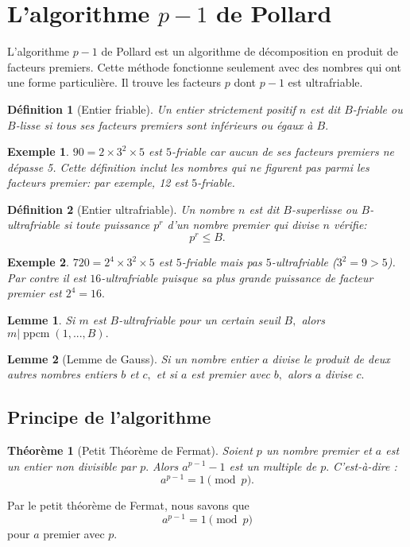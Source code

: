 \documentclass[french, 12pt, titlepage]{article}
\DeclareMathOperator{\ppcm}{ppcm}
\newtheorem{definition}{D{\'e}finition}
\newtheorem{theoreme}{Th{\'e}or{\`e}me}
\newtheorem{lemme}{Lemme}
\newtheorem{example}{Exemple}
\begin{document}
\section{L'algorithme $p-1$ de Pollard}

L'algorithme $p-1$ de Pollard est un algorithme de décomposition en produit de facteurs premiers. Cette méthode fonctionne seulement avec des nombres qui ont une forme particulière. Il trouve les facteurs $p$ dont $p-1$ est ultrafriable.

\begin{definition}[Entier friable]
Un entier strictement positif $n$ est dit $B$-friable ou $B$-lisse si tous ses facteurs premiers sont inférieurs ou égaux à $B.$ 
\end{definition}
\begin{example}
$90 = 2 \times 3^2 \times 5$ est $5$-friable car aucun de ses facteurs premiers ne dépasse 5.
Cette définition inclut les nombres qui ne figurent pas parmi les facteurs premier: par exemple, 12 est $5$-friable.
\end{example}
\begin{definition}[Entier ultrafriable]
Un nombre $n$ est dit $B$-superlisse ou $B$-ultrafriable si toute puissance $p^r$ d'un nombre premier qui divise $n$ vérifie: \[ p^r \leq B .\]
\end{definition}
\begin{example}
$720 = 2^4 \times 3^2 \times 5$ est $5$-friable mais pas $5$-ultrafriable ($3^2 = 9 > 5$). Par contre il est $16$-ultrafriable puisque sa plus grande puissance de facteur premier est $2^4 = 16.$
\end{example}

\begin{lemme}\label{leme}
Si $m$ est $B$-ultrafriable pour un certain seuil $B,$ alors $m | \ppcm(1,...,B).$
\end{lemme}

\begin{lemme}[Lemme de Gauss]
Si un nombre entier $a$ divise le produit de deux autres nombres entiers $b$ et $c,$ et si $a$ est premier avec $b,$ alors $a$ divise $c.$
\end{lemme}

\subsection{Principe de l'algorithme}

\begin{theoreme}[Petit Théorème de Fermat]
Soient $p$ un nombre premier et $a$ est un entier non divisible par $p.$ Alors $a^{p-1} - 1$ est un multiple de $p.$ C'est-à-dire : \[a^{p-1} = 1 \pmod p .\]
\end{theoreme}
Par le petit théorème de Fermat, nous savons que \[a^{p-1} = 1 \pmod p \] pour $a$ premier avec $p.$ 
\end{document}
